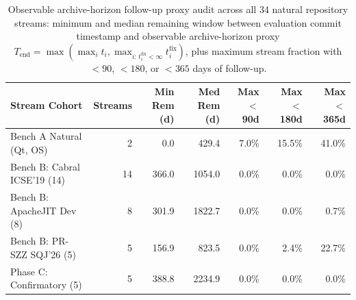 \documentclass[10pt,a4paper]{article}
\begin{document}
\begin{table}[!htbp]
\centering
\caption{Observable archive-horizon follow-up proxy audit across all 34 natural repository streams: minimum and median remaining window between evaluation commit timestamp and observable archive-horizon proxy $T_{\mathrm{end}} = \max(\max_i t_i, \max_{i:\, t_i^{\mathrm{fix}}<\infty} t_i^{\mathrm{fix}})$, plus maximum stream fraction with $<90$, $<180$, or $<365$ days of follow-up.}
\label{tab:followup_audit}
\fontsize{7.5}{9.0}\selectfont
\setlength{\tabcolsep}{2.2pt}
\begin{tabular*}{\textwidth}{@{\extracolsep\fill}lrrrrrr@{}}
\toprule
\textbf{Stream Cohort} & \textbf{Streams} & \textbf{Min Rem (d)} & \textbf{Med Rem (d)} & \textbf{Max $<$90d} & \textbf{Max $<$180d} & \textbf{Max $<$365d} \\
\midrule
Bench A Natural (Qt, OS) & 2 & 0.0 & 429.4 & 7.0\% & 15.5\% & 41.0\% \\
Bench B: Cabral ICSE'19 (14) & 14 & 366.0 & 1054.0 & 0.0\% & 0.0\% & 0.0\% \\
Bench B: ApacheJIT Dev (8) & 8 & 301.9 & 1822.7 & 0.0\% & 0.0\% & 0.7\% \\
Bench B: PR-SZZ SQJ'26 (5) & 5 & 156.9 & 823.5 & 0.0\% & 2.4\% & 22.7\% \\
Phase C: Confirmatory (5) & 5 & 388.8 & 2234.9 & 0.0\% & 0.0\% & 0.0\% \\
\bottomrule
\end{tabular*}
\end{table}
\end{document}

